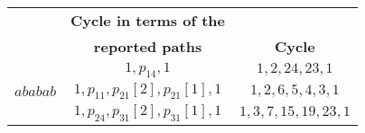 \small
\begin{tabular}{|c|c|c|}
\hline
\rowcolor{gray!30}&\multirow{1}{*}{{\textbf{Cycle in terms of the}}}&\multirow{1}{*}{{\textbf{}}}\\
\rowcolor{gray!30}\multirow{-2}{*}{{\textbf{Relator}}}&\multirow{1}{*}{{\textbf{reported paths}}}&\multirow{-2}{*}{{\textbf{Cycle}}}\\
\hline
\hline
\rowcolor{gray!10}\multirow{1}{*}{$acac$}&\multirow{1}{*}{$1,p_{14},1$}&\multirow{1}{*}{$1,2,24,23,1$}\\
\multirow{1}{*}{$ababab$}&\multirow{1}{*}{$1,p_{11},p_{21}[2],p_{21}[1],1$}&\multirow{1}{*}{$1,2,6,5,4,3,1$}\\
\rowcolor{gray!10}\multirow{1}{*}{$bcbcbc$}&\multirow{1}{*}{$1,p_{24},p_{31}[2],p_{31}[1],1$}&\multirow{1}{*}{$1,3,7,15,19,23,1$}\\
\hline
\end{tabular}